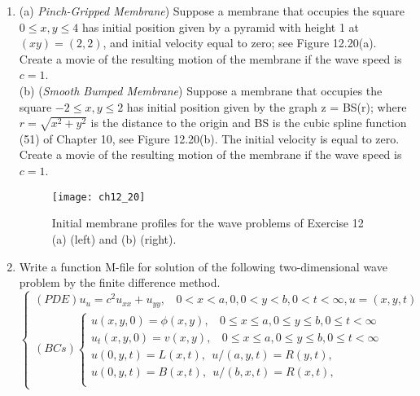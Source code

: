 \documentclass[../main.tex]{subfiles}
\begin{document}
{{\begin{enumerate}
(c) Data as in part (b) but $v(x,y)=2 sin (2\pi x)sin(\pi y$. Exact solution: Solution of part (b) 
plus $(2\sqrt{5})sin(2\pi x)sin(\pi y)sin(\sqrt{5}\pi t)$.
\\
Suggestion: The exact solutions of parts (b) and (c), so-called double Fourier series, can be estimated by finite sums of the form 
$u(x,y,t)=\dfrac{64}{\pi^6} \sum_{n=0}^{K} \sum_{n=0}^{K} \cdots$
where the integer K is chosen sufficiently large so that the series is accurate to MATLAB precision (i.e., maximum error $< 10^{15}$). Try to estimate mathematically how large K should be for this accuracy. See Section 5.3 for similar estimates.
	\item
		(a) \textit{Pinch-Gripped Membrane}) Suppose a membrane that occupies the square $0 \leqslant x,y \leqslant 4$ has initial position given by a pyramid with height 1 at $(xy) = (2,2)$, and initial velocity equal to zero; see Figure 12.20(a). Create a movie of the resulting motion of the membrane if the wave 
speed is $c = 1$.
\\
(b) (\textit{Smooth Bumped Membrane})
Suppose a membrane that occupies the square $-2 \leqslant x,y \leqslant 2 $
has initial position given by the graph z = BS(r); where $r = \sqrt{x^2+ y^2}$ is the distance to the origin and BS is the cubic spline function (51) of Chapter 10, see Figure 12.20(b). The initial velocity is equal to zero. Create a movie of the resulting motion of the membrane if the wave speed is $c = 1$.
\begin{figure}[H]
	\centering
	\texttt{[image: ch12\_20]}
	\caption{\textsf{Initial membrane profiles for the wave problems of Exercise 12 (a) (left) and (b) 
(right).}}
	\label{pfig:ch12_2=}
\end{figure}
	\item
		Write a function M-file for solution of the following two-dimensional wave problem by the 
finite difference method. 
$$\begin{cases} 
	(PDE) u_u=c^2 u_{xx}+u_{yy},~~~~0<x<a,0, 0<y<b,0<t<\infty,u=(x,y,t)\\
(BCs)
		\begin{cases}
		u(x,y,0)=\phi(x,y), ~~~~ 0\leqslant x \leqslant a,0\leqslant y \leqslant b, 0 \leqslant t< \infty \\
		u_t(x,y,0)=v(x,y), ~~~~ 0\leqslant x \leqslant a,0\leqslant y \leqslant b, 0 \leqslant t< \infty \\
		 u(0,y,t)=L(x,t),~~u/(a,y,t)=R(y,t),\\
		 u(0,y,t)=B(x,t),~~u/(b,x,t)=R(x,t),\\

\end{cases}
\end{cases}$$
\end{enumerate}}}
\end{document}
